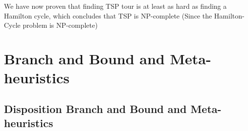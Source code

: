 \documentclass[10pt]{article}
\begin{document}
We have now proven that finding TSP tour is at least as hard as finding a Hamilton cycle, which concludes that TSP is NP-complete (Since the Hamilton-Cycle problem is NP-complete)

\clearpage \newpage
\section{Branch and Bound and Meta-heuristics} %
\label{sec:branch_and_bound_and_metaheuristics}

\subsection{Disposition Branch and Bound and Meta-heuristics} %
\label{sub:disposition_branch_and_bound_and_meta_heuristics}
\end{document}
